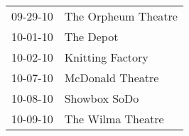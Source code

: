 \begin{supertabular}{p{0.25\columnwidth}p{0.75\columnwidth}}
 09-29-10 &  The Orpheum Theatre \\
 10-01-10 &            The Depot \\
 10-02-10 &     Knitting Factory \\
 10-07-10 &     McDonald Theatre \\
 10-08-10 &         Showbox SoDo \\
 10-09-10 &    The Wilma Theatre \\
\end{supertabular}
